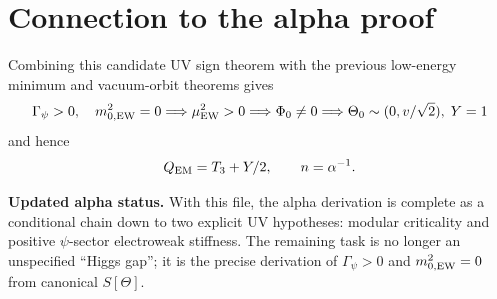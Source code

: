 \documentclass[12pt,a4paper]{article}
\begin{document}
\section{Connection to the alpha proof}

Combining this candidate UV sign theorem with the previous low-energy minimum
and vacuum-orbit theorems gives
\[
  \Gamma_{\psi}>0,
  \quad
  m_{0,\rm EW}^2=0
  \Longrightarrow
  \mu_{\rm EW}^2>0
  \Longrightarrow
  \Phi_0\ne0
  \Longrightarrow
  \Theta_0\sim(0,v/\sqrt2),\;Y=1
\]
and hence
\[
  Q_{\rm EM}=T_3+Y/2,
  \qquad
  n=\alpha^{-1}.
\]

\begin{resultbox}
\textbf{Updated alpha status.} With this file, the alpha derivation is complete
as a conditional chain down to two explicit UV hypotheses: modular criticality
and positive $\psi$-sector electroweak stiffness.  The remaining task is no
longer an unspecified ``Higgs gap''; it is the precise derivation of
$\Gamma_{\psi}>0$ and $m_{0,\rm EW}^2=0$ from canonical $S[\Theta]$.
\end{resultbox}

\ifdefined\INCLUDEMODE\else
\end{document}
